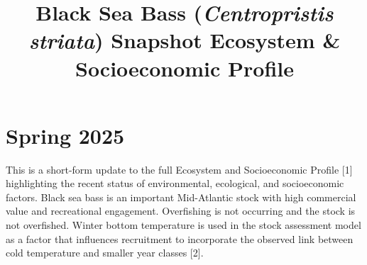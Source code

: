\documentclass[
  10pt,
  letterpaper,
  DIV=11,
  numbers=noendperiod]{scrartcl}
\title{Black Sea Bass (\protect\textit{Centropristis striata})
\linebreak Snapshot Ecosystem \& Socioeconomic Profile}
\author{}
\date{}
\begin{document}
\maketitle


\vspace{-2.5cm}
\section{Spring 2025}

This is a short-form update to the full Ecosystem and Socioeconomic
Profile {[}1{]} highlighting the recent status of environmental,
ecological, and socioeconomic factors. Black sea bass is an important
Mid-Atlantic stock with high commercial value and recreational
engagement. Overfishing is not occurring and the stock is not
overfished. Winter bottom temperature is used in the stock assessment
model as a factor that influences recruitment to incorporate the
observed link between cold temperature and smaller year classes {[}2{]}.

\vspace{-0.25cm}
\end{document}
